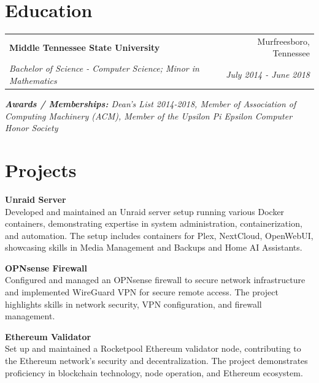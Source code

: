 \documentclass[a4paper,20pt]{article}
\makeatletter
\newcommand{\resumeSubheading}[4]{
  \vspace{-1pt}\item
    \begin{tabular*}{0.97\textwidth}{l@{\extracolsep{\fill}}r}
      \textbf{#1} & #2 \\
      \textit{#3} & \textit{#4} \\
    \end{tabular*}\vspace{-5pt}
}
\makeatother
\begin{document}
{\color{MidnightBlue} \section{\textbf{Education}}}
  \resumeSubHeadingListStart
    \resumeSubheading
      {Middle Tennessee State University}{Murfreesboro, Tennessee}
      {Bachelor of Science - Computer Science; Minor in Mathematics}{July 2014 - June 2018}
      \vspace{5pt}
      {\scriptsize \textit{ \footnotesize{\newline{}\textbf{Awards / Memberships:} Dean’s List 2014-2018, Member of Association of Computing Machinery (ACM), Member of the Upsilon Pi Epsilon Computer Honor Society}}}
    \resumeSubHeadingListEnd
  \vspace{5pt}

{\color{Periwinkle} \section{\textbf{Projects}}}
  \begin{description}
    \item \textbf{Unraid Server} \\
  {\small Developed and maintained an Unraid server setup running various Docker containers, demonstrating expertise in system administration, containerization, and automation. The setup includes containers for Plex, NextCloud, OpenWebUI, showcasing skills in Media Management and Backups and Home AI Assistants.}
\item \textbf{OPNsense Firewall} \\
{\small Configured and managed an OPNsense firewall to secure network infrastructure and implemented WireGuard VPN for secure remote access. The project highlights skills in network security, VPN configuration, and firewall management.}
\item \textbf{Ethereum Validator} \\
{\small Set up and maintained a Rocketpool Ethereum validator node, contributing to the Ethereum network's security and decentralization. The project demonstrates proficiency in blockchain technology, node operation, and Ethereum ecosystem.}
\end{description}


\end{document}
